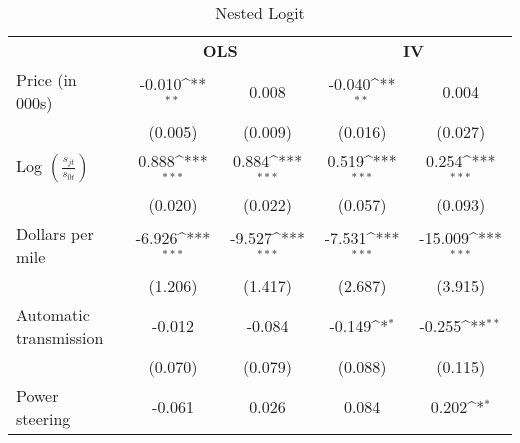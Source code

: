 \begin{table}[htbp] \fontsize{8pt}{10pt}\selectfont
    \centering
    \def\sym#1{\ifmmode^{#1}\else\(^{#1}\)\fi}
    \caption{Nested Logit}
    \label{nl}
    \begin{tabular}{l*{4}{c}}
        \hline\hline
        \multicolumn{1}{c}{}                       & \multicolumn{2}{c}{\multirow{2}{*}{\bfseries OLS}} &
        \multicolumn{2}{c}{\multirow{2}{*}{\bfseries IV}}                                                                                                      \\
                                                   &                                                    &                 &                 &                  \\
        \cmidrule(lr){2-3} \cmidrule(lr){4-5}
        Price (in 000s)                            & -0.010\sym{**}                                     & 0.008           & -0.040\sym{**}  & 0.004            \\
                                                   & (0.005)                                            & (0.009)         & (0.016)         & (0.027)          \\
        [1em]
        Log $\left( \frac{s_{jt}}{s_{0t}} \right)$ & 0.888\sym{***}                                     & 0.884\sym{***}  & 0.519\sym{***}  & 0.254\sym{***}   \\
                                                   & (0.020)                                            & (0.022)         & (0.057)         & (0.093)          \\
        [1em]
        Dollars per mile                           & -6.926\sym{***}                                    & -9.527\sym{***} & -7.531\sym{***} & -15.009\sym{***} \\
                                                   & (1.206)                                            & (1.417)         & (2.687)         & (3.915)          \\
        [1em]
        Automatic transmission                     & -0.012                                             & -0.084          & -0.149\sym{*}   & -0.255\sym{**}   \\
                                                   & (0.070)                                            & (0.079)         & (0.088)         & (0.115)          \\
        [1em]
        Power steering                             & -0.061                                             & 0.026           & 0.084           & 0.202\sym{*}     \\

\end{tabular}
\end{table}
